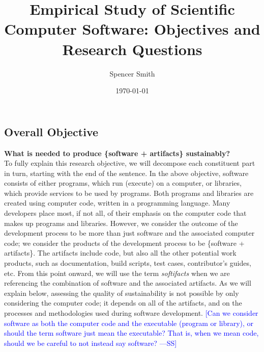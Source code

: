 \documentclass[12pt]{article}
\newcommand{\authornote}[3]{\textcolor{#1}{[#3 ---#2]}}
\newcommand{\authornote}[3]{}
\newcommand{\wss}[1]{\authornote{blue}{SS}{#1}} %
\begin{document}
\title{Empirical Study of Scientific Computer Software: Objectives and Research Questions} 
\author{Spencer Smith}
\date{\today}
	

\subsection* {Overall Objective}

\textbf{What is needed to produce \{software + artifacts\} sustainably?}\\

To fully explain this research objective, we will decompose each constituent
part in turn, starting with the end of the sentence.  In the above objective,
software consists of either programs, which run (execute) on a computer, or
libraries, which provide services to be used by programs.  Both programs and
libraries are created using computer code, written in a programming language.
Many developers place most, if not all, of their emphasis on the computer code
that makes up programs and libraries.  However, we consider the outcome of the
development process to be more than just software and the associated computer
code; we consider the products of the development process to be \{software +
artifacts\}.  The artifacts include code, but also all the other potential work
products, such as documentation, build scripts, test cases, contributor's
guides, etc.  From this point onward, we will use the term \emph{softifacts}
when we are referencing the combination of software and the associated
artifacts.  As we will explain below, assessing the quality of sustainability is not
possible by only considering the computer code; it depends on all of the
artifacts, and on the processes and methodologies used during software
development.  \wss{Can we consider software as both the computer code and the
  executable (program or library), or should the term software just mean the
  executable?  That is, when we mean code, should we be careful to not instead
  say software?}
\end{document}
